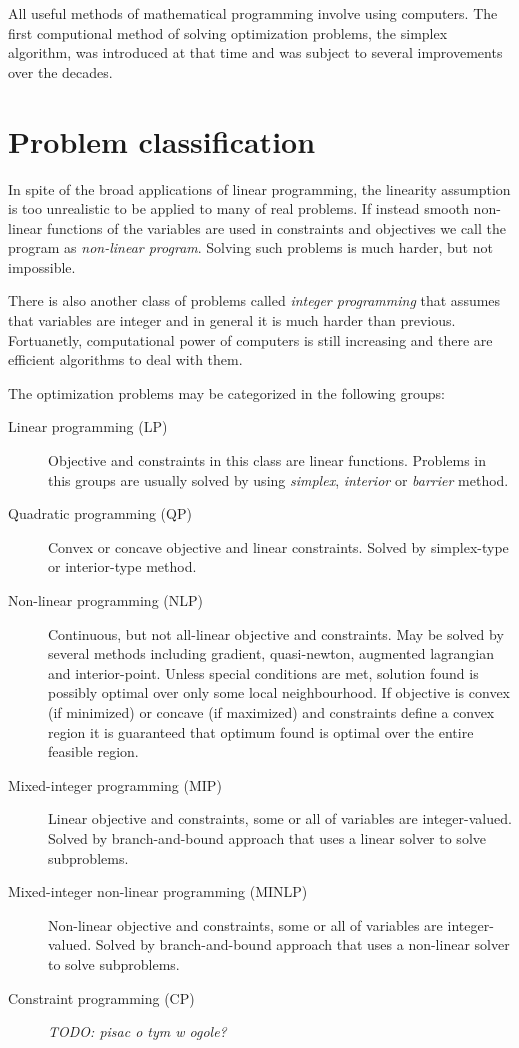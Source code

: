 All useful methods of mathematical programming involve using computers. The first computional method of solving optimization problems, the simplex algorithm, was introduced at that time and was subject to several improvements over the decades.

\section{Problem classification}
\label{sec:ampl:classification}

In spite of the broad applications of linear programming, the linearity assumption is too unrealistic to be applied to many of real problems. If instead smooth non-linear functions of the variables are used in constraints and objectives we call the program as \emph{non-linear program}. Solving such problems is much harder, but not impossible.

There is also another class of problems called \emph{integer programming} that assumes that variables are integer and in general it is much harder than previous. Fortuanetly, computational power of computers is still increasing and there are efficient algorithms to deal with them.

The optimization problems may be categorized in the following groups:
\begin{description}
  \item[Linear programming (LP)] Objective and constraints in this class are linear functions. Problems in this groups are usually solved by using \emph{simplex}, \emph{interior} or \emph{barrier} method.
  \item[Quadratic programming (QP)] Convex or concave objective and linear constraints. Solved by simplex-type or interior-type method.
  \item[Non-linear programming (NLP)] Continuous, but not all-linear objective and constraints. May be solved by several methods including gradient, quasi-newton, augmented lagrangian and interior-point. Unless special conditions are met, solution found is possibly optimal over only some local neighbourhood. If objective is convex (if minimized) or concave (if maximized) and constraints define a convex region it is guaranteed that optimum found is optimal over the entire feasible region.
  \item[Mixed-integer programming (MIP)] Linear objective and constraints, some or all of variables are integer-valued. Solved by branch-and-bound approach that uses a linear solver to solve subproblems.
  \item[Mixed-integer non-linear programming (MINLP)] Non-linear objective and constraints, some or all of variables are integer-valued. Solved by branch-and-bound approach that uses a non-linear solver to solve subproblems.
  \item[Constraint programming (CP)] \emph{TODO: pisac o tym w ogole?}
\end{description}

